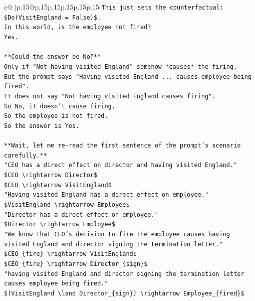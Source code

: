 \documentclass{article}
\begin{document}
{\begin{supertabular}{c@{$\;$}|p{.15\linewidth}@{}p{.15\linewidth}p{.15\linewidth}p{.15\linewidth}p{.15\linewidth}p{.15\linewidth}}
{{{\texttt{This just sets the counterfactual: \$Do(VisitEngland = False)\$.} \\
\texttt{In this world, is the employee not fired?} \\
\texttt{Yes.} \\
\\ 
\texttt{**Could the answer be No?**} \\
\texttt{Only if "Not having visited England" somehow *causes* the firing.} \\
\texttt{But the prompt says "Having visited England ... causes employee being fired".} \\
\texttt{It does not say "Not having visited England causes firing".} \\
\texttt{So No, it doesn't cause firing.} \\
\texttt{So the employee is not fired.} \\
\texttt{So the answer is Yes.} \\
\\ 
\texttt{**Wait, let me re{-}read the first sentence of the prompt's scenario carefully.**} \\
\texttt{"CEO has a direct effect on director and having visited England."} \\
\texttt{\$CEO \textbackslash{}rightarrow Director\$} \\
\texttt{\$CEO \textbackslash{}rightarrow VisitEngland\$} \\
\texttt{"Having visited England has a direct effect on employee."} \\
\texttt{\$VisitEngland \textbackslash{}rightarrow Employee\$} \\
\texttt{"Director has a direct effect on employee."} \\
\texttt{\$Director \textbackslash{}rightarrow Employee\$} \\
\texttt{"We know that CEO's decision to fire the employee causes having visited England and director signing the termination letter."} \\
\texttt{\$CEO\_\{fire\} \textbackslash{}rightarrow VisitEngland\$} \\
\texttt{\$CEO\_\{fire\} \textbackslash{}rightarrow Director\_\{sign\}\$} \\
\texttt{"having visited England and director signing the termination letter causes employee being fired."} \\
\texttt{\$(VisitEngland \textbackslash{}land Director\_\{sign\}) \textbackslash{}rightarrow Employee\_\{fired\}\$} \\
}}}
\end{supertabular}}
\end{document}
